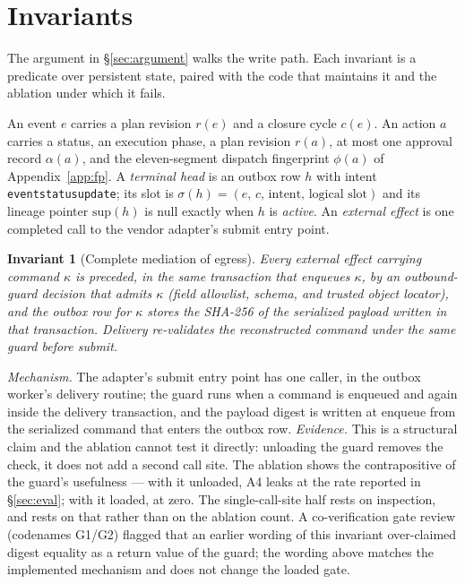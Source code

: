 \documentclass[acmsmall,manuscript,review,anonymous]{acmart}
\renewcommand{\_}{\discretionary{\textunderscore}{}{\textunderscore}}
\newtheorem{invariant}{Invariant}
\begin{document}
\section{Invariants}
\label{sec:inv}

The argument in \S\ref{sec:argument} walks the write path. Each
invariant is a predicate over persistent state, paired with the code
that maintains it and the ablation under which it fails.

\begin{definition}
\label{def:state}
An event $e$ carries a plan revision $r(e)$ and a closure cycle $c(e)$. An
action $a$ carries a status, an execution phase, a plan revision $r(a)$, at most
one approval record $\alpha(a)$, and the eleven-segment dispatch fingerprint
$\phi(a)$ of Appendix~\ref{app:fp}. A \emph{terminal head} is an outbox row $h$
with intent \texttt{event\_status\_update}; its slot is
$\sigma(h)=(e,\,c,\,\text{intent},\,\text{logical slot})$ and its lineage pointer
$\mathrm{sup}(h)$ is null exactly when $h$ is \emph{active}. An \emph{external
effect} is one completed call to the vendor adapter's submit entry point.
\end{definition}

\begin{invariant}[Complete mediation of egress]
\label{inv:mediate}
Every external effect carrying command $\kappa$ is preceded, in the same
transaction that enqueues $\kappa$, by an outbound-guard decision that
admits $\kappa$ (field allowlist, schema, and trusted object locator),
and the outbox row for $\kappa$ stores the SHA-256 of the serialized
payload written in that transaction. Delivery re-validates the
reconstructed command under the same guard before submit.
\end{invariant}

\noindent\emph{Mechanism.} The adapter's submit entry point has one caller, in
the outbox worker's delivery routine; the guard runs when a command is
enqueued and again inside the delivery transaction, and the payload digest is
written at enqueue from the serialized command that enters the outbox row.
\emph{Evidence.} This is a structural claim and the
ablation cannot test it directly: unloading the guard removes the check, it does
not add a second call site. The ablation shows the contrapositive of the
guard's usefulness --- with it unloaded, A4 leaks at the rate reported in
\S\ref{sec:eval}; with it loaded, at zero. The single-call-site half rests on
inspection, and rests on that rather than on the ablation count.
A co-verification gate review (codenames G1/G2) flagged that an earlier
wording of this invariant over-claimed digest equality as a return value of
the guard; the wording above matches the implemented mechanism and does not
change the loaded gate.
\end{document}
